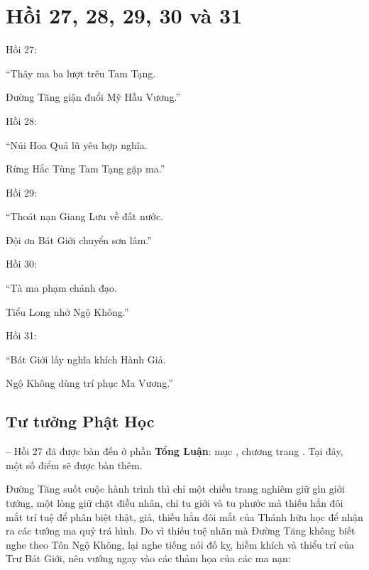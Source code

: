 \chapter{Hồi 27, 28, 29, 30 và 31} %
\label{cha:hoi_27_28}

Hồi 27:

\begin{itshape}
``Thây ma ba lượt trêu Tam Tạng.

Đường Tăng giận đuổi Mỹ Hầu Vương.''
\end{itshape}

Hồi 28:

\begin{itshape}
``Núi Hoa Quả lũ yêu hợp nghĩa.

Rừng Hắc Tùng Tam Tạng gặp ma.''
\end{itshape}

Hồi 29:

\begin{itshape}
``Thoát nạn Giang Lưu về đất nước.

Đội ơn Bát Giới chuyển sơn lâm.''
\end{itshape}

Hồi 30:

\begin{itshape}
``Tà ma phạm chánh đạo.

Tiểu Long nhớ Ngộ Không.''
\end{itshape}

Hồi 31:

\begin{itshape}
``Bát Giới lấy nghĩa khích Hành Giả.

Ngộ Không dùng trí phục Ma Vương.''
\end{itshape}

\section{Tư tưởng Phật Học} %
\label{sec:27_28_phat_hoc}

-- Hồi 27 đã được bàn đến ở phần {\bf Tổng Luận}: mục , chương  trang \pageref{sec:bieu_tuong_cua_hoi_thu_26}. Tại đây, một số điểm sẽ được bàn thêm.

Đường Tăng suốt cuộc hành trình thì chỉ một chiều trang nghiêm giữ gìn giới tướng, một lòng giữ chặt điều nhân, chỉ tu giới và tu phước mà thiếu hẳn đôi mắt trí tuệ để phân biệt thật, giả, thiếu hẳn đôi mắt của Thánh hữu học để nhận ra các tướng ma quỷ trá hình. Do vì thiếu tuệ nhãn mà Đường Tăng không biết nghe theo Tôn Ngộ Không, lại nghe tiếng nói đố kỵ, hiềm khích và thiểu trí của Trư Bát Giới, nên vướng ngay vào các thảm họa của các ma nạn:

